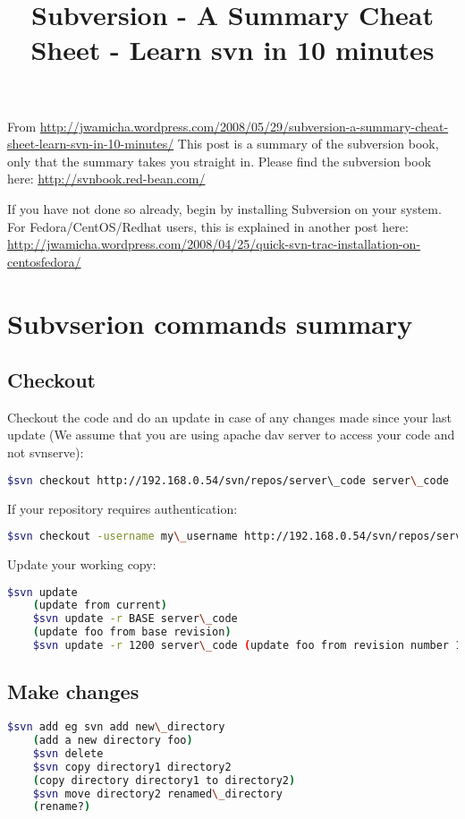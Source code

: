 \documentclass{article}
\title{Subversion - A Summary Cheat Sheet - Learn svn in 10 minutes}
\author{}
\date{}
\begin{document}
\maketitle{}
From \url{http://jwamicha.wordpress.com/2008/05/29/subversion-a-summary-cheat-sheet-learn-svn-in-10-minutes/}
\newline
This post is a summary of the subversion book, only that the summary takes you straight in. Please find the subversion book here: \url{http://svnbook.red-bean.com/}

If you have not done so already, begin by installing Subversion on your system. For Fedora/CentOS/Redhat users, this is explained in another post here:
\url{http://jwamicha.wordpress.com/2008/04/25/quick-svn-trac-installation-on-centosfedora/}

\section{Subvserion commands summary}

\subsection{Checkout}
Checkout the code and do an update in case of any changes made since your last update (We assume that you are using apache dav server to access your code and not svnserve):
\begin{lstlisting}[language=BASH]
    $svn checkout http://192.168.0.54/svn/repos/server\_code server\_code 
\end{lstlisting}
If your repository requires authentication:
\begin{lstlisting}[language=BASH]
    $svn checkout -username my\_username http://192.168.0.54/svn/repos/server\_code server\_code
\end{lstlisting}
Update your working copy:
\begin{lstlisting}[language=BASH]
    $svn update
    (update from current)
    $svn update -r BASE server\_code
    (update foo from base revision)
    $svn update -r 1200 server\_code (update foo from revision number 1200) 
\end{lstlisting}

\subsection{Make changes}
\begin{lstlisting}[language=BASH]
    $svn add eg svn add new\_directory
    (add a new directory foo)
    $svn delete
    $svn copy directory1 directory2
    (copy directory directory1 to directory2)
    $svn move directory2 renamed\_directory
    (rename?) 
\end{lstlisting}
\end{document}
